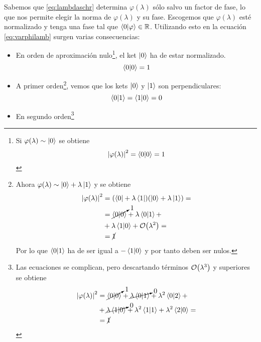 Sabemos que \eqref{eq:lambdaschr} determina $\varphi(\lambda)$ sólo salvo
un factor de fase, lo que nos permite elegir la norma de
$\varphi(\lambda)$ y su fase. Escogemos que $\varphi(\lambda)$ esté
normalizado y tenga una fase tal que $\braket{0}{\varphi} \in
\mathbb{R}$. Utilizando esto en la ecuación \eqref{eq:varphilamb} surgen
varias consecuencias:
\begin{itemize}
\item En orden de aproximación nulo\footnote{ Si $\varphi(\lambda) \sim
    \ket{0}$ se obtiene
    \begin{equation*}
      \abs{\varphi(\lambda)}^2 = \braket{0}{0} = 1
    \end{equation*}
}, el ket $\ket{0}$ ha de estar
  normalizado.
\begin{equation}
  \braket{0}{0} =1
\end{equation}
\item A primer orden\footnote{Ahora $\varphi(\lambda)\sim \ket{0} +
    \lambda \ket{1}$ y se obtiene
    \begin{equation*}
      \begin{split}
        \abs{\varphi(\lambda)}^2 &= (\bra{0} + \lambda\bra{1})(\ket{0} +
        \lambda\ket{1}) = \\
        &= \cancelto{1}{\ip{0}} + \lambda\braket{0}{1} + \\ &+ \lambda\braket{1}{0} +
        \order{\lambda^2} = \\
        &= \cancel{1}
      \end{split}
    \end{equation*}
    Por lo que $\braket{0}{1}$ ha de ser igual a $-\braket{1}{0}$ y
    por tanto deben ser nulos.
    }, vemos que los kets $\ket{0}$ y $\ket{1}$ son
  perpendiculares:
\begin{equation}
  \braket{0}{1} = \braket{1}{0} = 0
\end{equation}
\item En segundo orden\footnote{
Las ecuaciones se complican, pero descartando términos
$\order{\lambda^3}$ y superiores se obtiene
\begin{equation*}
  \begin{split}
    \abs{\varphi(\lambda)}^2 
    &= \cancelto{1}{\ip{0}} + \cancelto{0}{\lambda\braket{0}{1}} + \lambda^2 \braket{0}{2} + \\
    &+  \cancelto{0}{\lambda\braket{1}{0}} + \lambda^2 \braket{1}{1} +
    \lambda^2 \braket{2}{0} = \\ &= \cancel{1}
  \end{split}

\end{equation*}}
\end{itemize}
